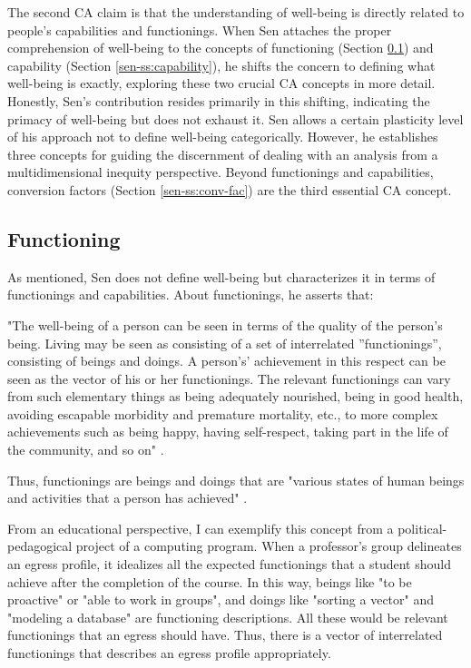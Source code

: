 The second \gls{CA} claim is that the understanding of well-being is directly related to people's capabilities and functionings. When Sen attaches the proper comprehension of well-being to the concepts of functioning (Section \ref{sen-ss:functioning}) and capability (Section \ref{sen-ss:capability}), he shifts the concern to defining what well-being is exactly, exploring these two crucial \gls{CA} concepts in more detail. Honestly, Sen's contribution resides primarily in this shifting, indicating the primacy of well-being but does not exhaust it. Sen allows a certain plasticity level of his approach not to define well-being categorically. However, he establishes three concepts for guiding the discernment of dealing with an analysis from a multidimensional inequity perspective. Beyond functionings and capabilities, conversion factors (Section \ref{sen-ss:conv-fac}) are the third essential \gls{CA} concept.

\subsection{Functioning}
\label{sen-ss:functioning}

As mentioned, Sen does not define well-being but characterizes it in terms of functionings and capabilities. About functionings, he asserts that:
\begin{citacao}
    "The well-being of a person can be seen in terms of the quality of the person's being. Living may be seen as consisting of a set of interrelated ''functionings'', consisting of beings and doings. A person's' achievement in this respect can be seen as the vector of his or her functionings. The relevant functionings can vary from such elementary things as being adequately nourished, being in good health, avoiding escapable morbidity and premature mortality, etc., to more complex achievements such as being happy, having self-respect, taking part in the life of the community, and so on" \cite[p.~39]{sen:1992}.
\end{citacao}
Thus, functionings are beings and doings that are "various states of human beings and activities that a person has achieved" \cite{robeyns:2023}.

From an educational perspective, I can exemplify this concept from a political-pedagogical project of a computing program. When a professor's group delineates an egress profile, it idealizes all the expected functionings that a student should achieve after the completion of the course. In this way, beings like "to be proactive" or "able to work in groups", and doings like "sorting a vector" and "modeling a database" are functioning descriptions. All these would be relevant functionings that an egress should have. Thus, there is a vector of interrelated functionings that describes an egress profile appropriately.

